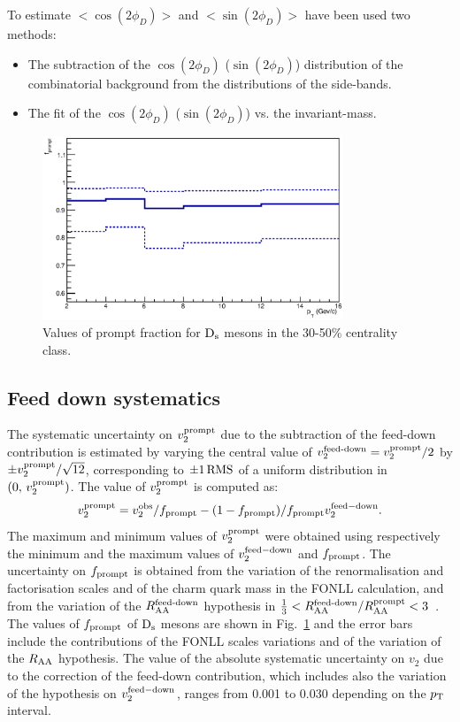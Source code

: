 To estimate $< \cos(2\phi_D) >$ and $< \sin(2\phi_D) >$ 
have been used two methods:
\begin{itemize}
\item The subtraction of the $\cos(2\phi_D)$ ($\sin(2\phi_D)$) 
distribution of the combinatorial background from the distributions of the side-bands.
\item The fit of the $\cos(2\phi_D)$ ($\sin(2\phi_D)$) vs. the invariant-mass.
\end{itemize}
\fi
\begin{figure}
 \centering
 \includegraphics[width=9cm]{FigCap5/fprompt_3050.eps}
\caption{Values of prompt fraction for ${\rm D_s}$ mesons in the 30-50\% centrality class.}
\label{fig:fPrompt}
\end{figure}

\subsection{Feed down systematics}
\label{FDsystV2}
The systematic uncertainty on $v_{2}^{\rm prompt}$ due to the subtraction of the feed-down contribution 
is estimated by varying the central value of 
$v_{2}^{\rm feed\textnormal{-}down}=v_{2}^{\rm prompt}/2$ by $ \pm v_{2}^{\rm prompt}/\sqrt{12}$, corresponding to 
$\rm \pm 1\,RMS$ of a uniform distribution in $(0,\,v_{2}^{\rm prompt})$.
The value of $v_2^{\rm prompt}$ is computed as:
\begin{equation}
v_{2}^{\rm prompt}=v_{2}^{\rm obs}/f_{\rm prompt} - (1-f_{\rm prompt})/f_{\rm prompt}v_{2}^{\rm feed-down}.
\end{equation} 
The maximum and minimum values of $v_2^{\rm prompt}$ were
obtained using respectively the minimum and the maximum values 
of $v_{\rm 2}^{\rm feed-down}$ and $f_{\rm prompt}$. 
The uncertainty on $f_{\rm prompt}$ is obtained from the
variation of the renormalisation and factorisation scales and of the charm quark
mass in the FONLL calculation, and from the variation of the 
$R_{\rm AA}^{\rm feed\textnormal{-}down}$ hypothesis in  
$\frac{1}{3}< R_{\rm AA}^{\rm feed\textnormal{-}down}/R_{\rm AA}^{\rm prompt}<3$~\cite{Adam:2015jda}. 
The values of $f_{\rm prompt}$ of ${\rm D_s}$ mesons
are shown in Fig.~\ref{fig:fPrompt} and the error bars include the
contributions of the FONLL scales variations and of the variation of
the $R_{\rm AA}$ hypothesis. The value of the absolute systematic uncertainty on $v_2$
due to the correction of the feed-down contribution, which includes also the variation
of the hypothesis on $v_{\rm 2}^{\rm feed-down}$, ranges from 0.001 to 0.030 depending on the $p_{\rm T}$ interval.

